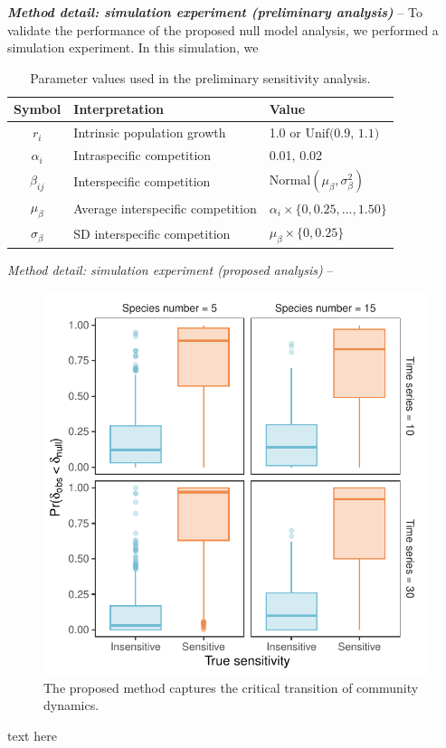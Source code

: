 \documentclass[12pt, class=article, crop=false]{standalone}
\begin{document}
\textbf{\textit{Method detail: simulation experiment (preliminary analysis)}} -- 
To validate the performance of the proposed null model analysis, we performed a simulation experiment. In this simulation, we 

\begin{table}
    \centering
    \caption{Parameter values used in the preliminary sensitivity analysis.}
    \begin{tabular}{cll}
        Symbol & Interpretation & Value\\
        \hline
        $r_i$            & Intrinsic population growth  & 1.0 or $\mbox{Unif(0.9, 1.1)}$\\
        $\alpha_{i}$     & Intraspecific competition    & 0.01, 0.02\\
        $\beta_{ij}$     & Interspecific competition    & $\mbox{Normal}(\mu_{\beta}, \sigma_{\beta}^2)$\\
        $\mu_{\beta}$    & Average interspecific competition & $\alpha_i \times \{0, 0.25, ..., 1.50\}$\\
        $\sigma_{\beta}$ & SD interspecific competition & $\mu_{\beta} \times \{0,  0.25\}$\\
        \hline
    \end{tabular}
    \label{tab:my_label}
\end{table}

\textit{Method detail: simulation experiment (proposed analysis)} --

\begin{figure}
    \includegraphics[scale=0.85]{output/figure_eigen.pdf}
    \caption{The proposed method captures the critical transition of community dynamics.}
    \label{fig:diffuse}
\end{figure}

text here 


\end{document}
